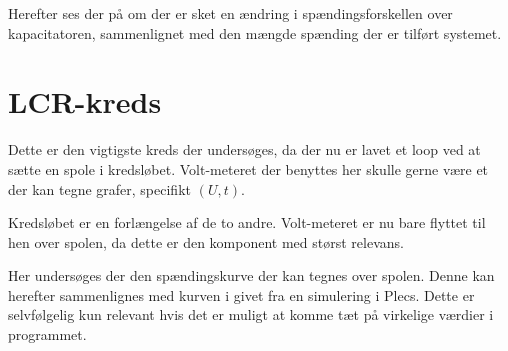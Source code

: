 \documentclass[a4paper,11pt]{memoir}
\begin{document}
Herefter ses der på om der er sket en ændring i spændingsforskellen over kapacitatoren, sammenlignet med den mængde spænding der er tilført systemet.
\section{LCR-kreds}
Dette er den vigtigste kreds der undersøges, da der nu er lavet et loop ved at sætte en spole i kredsløbet. Volt-meteret der benyttes her skulle gerne være et der kan tegne grafer, specifikt $(U,t)$.

Kredsløbet er en forlængelse af de to andre. Volt-meteret er nu bare flyttet til hen over spolen, da dette er den komponent med størst relevans.

Her undersøges der den spændingskurve der kan tegnes over spolen. Denne kan herefter sammenlignes med kurven i givet fra en simulering i Plecs. Dette er selvfølgelig kun relevant hvis det er muligt at komme tæt på virkelige værdier i programmet.
\end{document}
